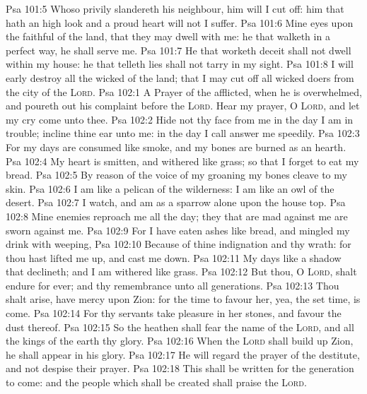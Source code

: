 \vs Psa 101:5 Whoso privily slandereth his neighbour, him will I cut off: him that hath an high look and a proud heart will not I suffer.
\vs Psa 101:6 Mine eyes  upon the faithful of the land, that they may dwell with me: he that walketh in a perfect way, he shall serve me.
\vs Psa 101:7 He that worketh deceit shall not dwell within my house: he that telleth lies shall not tarry in my sight.
\vs Psa 101:8 I will early destroy all the wicked of the land; that I may cut off all wicked doers from the city of the \textsc{Lord}.
\vs Psa 102:1 A Prayer of the afflicted, when he is overwhelmed, and poureth out his complaint before the \textsc{Lord}. Hear my prayer, O \textsc{Lord}, and let my cry come unto thee.
\vs Psa 102:2 Hide not thy face from me in the day  I am in trouble; incline thine ear unto me: in the day  I call answer me speedily.
\vs Psa 102:3 For my days are consumed like smoke, and my bones are burned as an hearth.
\vs Psa 102:4 My heart is smitten, and withered like grass; so that I forget to eat my bread.
\vs Psa 102:5 By reason of the voice of my groaning my bones cleave to my skin.
\vs Psa 102:6 I am like a pelican of the wilderness: I am like an owl of the desert.
\vs Psa 102:7 I watch, and am as a sparrow alone upon the house top.
\vs Psa 102:8 Mine enemies reproach me all the day;  they that are mad against me are sworn against me.
\vs Psa 102:9 For I have eaten ashes like bread, and mingled my drink with weeping,
\vs Psa 102:10 Because of thine indignation and thy wrath: for thou hast lifted me up, and cast me down.
\vs Psa 102:11 My days  like a shadow that declineth; and I am withered like grass.
\vs Psa 102:12 But thou, O \textsc{Lord}, shalt endure for ever; and thy remembrance unto all generations.
\vs Psa 102:13 Thou shalt arise,  have mercy upon Zion: for the time to favour her, yea, the set time, is come.
\vs Psa 102:14 For thy servants take pleasure in her stones, and favour the dust thereof.
\vs Psa 102:15 So the heathen shall fear the name of the \textsc{Lord}, and all the kings of the earth thy glory.
\vs Psa 102:16 When the \textsc{Lord} shall build up Zion, he shall appear in his glory.
\vs Psa 102:17 He will regard the prayer of the destitute, and not despise their prayer.
\vs Psa 102:18 This shall be written for the generation to come: and the people which shall be created shall praise the \textsc{Lord}.
